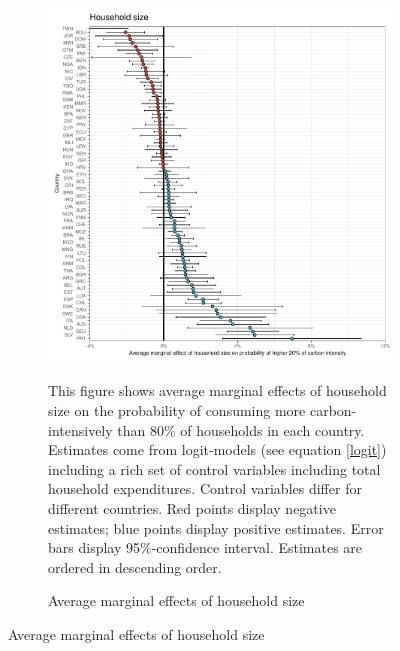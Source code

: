  \begin{figure}[ht!]\ContinuedFloat
   \centering
   \begin{subfigure}[b]{\textwidth}
   \centering
   \includegraphics{1_Figures/Analysis_Logit_Models_Marginal_Effects/Average_Marginal_Effects_affected_upper_80_hh_size_2017B.pdf}
   \caption{Average marginal effects of household size} \label{fig:Logit_ME_size}
   \begin{subcaption2}
     This figure shows average marginal effects of household size on the probability of consuming more carbon-intensively than 80\% of households in each country. Estimates come from logit-models (see equation \ref{logit}) including a rich set of control variables including total household expenditures. Control variables differ for different countries. Red points display negative estimates; blue points display positive estimates. Error bars display 95\%-confidence interval. Estimates are ordered in descending order.
   \end{subcaption2}
   \end{subfigure}
 \end{figure}
 \clearpage

